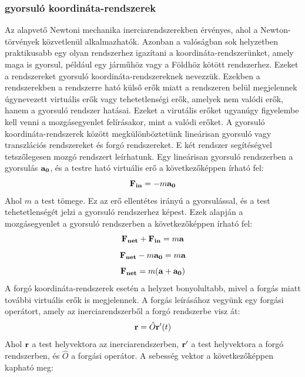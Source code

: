 \documentclass[../main.tex]{subfiles}
\begin{document}
\subsubsection{gyorsuló koordináta-rendszerek}
Az alapvető Newtoni mechanika inerciarendszerekben érvényes, ahol a Newton-törvények közvetlenül alkalmazhatók. Azonban a valóságban sok helyzetben praktikusabb egy olyan rendszerhez igazítani a koordináta-rendszerünket,
amely maga is gyorsul, például egy járműhöz vagy a Földhöz kötött rendszerhez. Ezeket a rendszereket gyorsuló koordináta-rendszereknek nevezzük. Ezekben a rendszerekben a rendszerre ható külső erők miatt a rendszeren belül
megjelennek úgynevezett virtuális erők vagy tehetetlenségi erők, amelyek nem valódi erők, hanem a gyorsuló rendszer hatásai. Ezeket a virutális erőket ugyanúgy figyelembe kell venni a mozgásegyenlet felírásakor, mint a valódi erőket.
A gyorsuló koordináta-rendszerek között megkülönböztetünk lineárisan gyorsuló vagy transzlációs rendszereket és forgó rendszereket. E két rendszer segítéségvel tetszőlegesen mozgó rendszert leírhatunk. Egy lineárisan gyorsuló rendszerben
a gyorsulás $\bold{a_0}$, és a testre ható virtuális erő a következőképpen írható fel:
\begin{equation}
    \bold{F_{in}} = -m\bold{a_0}
\end{equation}
Ahol $m$ a test tömege. Ez az erő ellentétes irányú a gyorsulással, és a test tehetetlenségét jelzi a gyorsuló rendszerhez képest. Ezek alapján a mozgásegyenlet a gyorsuló rendszerben a következőképpen írható fel:
\begin{equation}
    \bold{F_{net}} + \bold{F_{in}} = m\bold{a}
\end{equation}
\begin{equation}
    \bold{F_{net}} - m\bold{a_0} = m\bold{a}
\end{equation}
\begin{equation}
    \bold{F_{net}} = m(\bold{a} + \bold{a_0})
\end{equation}
A forgó koordináta-rendszerek esetén a helyzet bonyolultabb, mivel a forgás miatt további virtuális erők is megjelennek. A forgás leírásához vegyünk egy forgási operátort, amely az inerciarendszerből a forgó rendszerbe visz át:
\begin{equation}
    \bold{r} = \hat{O}\bold{r'}(t)
\end{equation}
Ahol $\bold{r}$ a test helyvektora az inerciarendszerben, $\bold{r'}$ a test helyvektora a forgó rendszerben, és $\hat{O}$ a forgási operátor. A sebesség vektor a következőképpen kapható meg:
\end{document}
